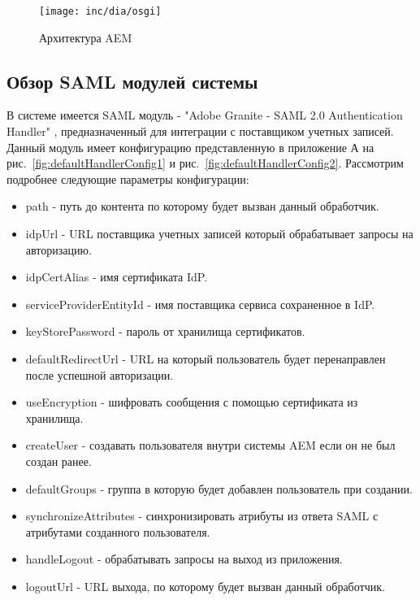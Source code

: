 \begin{figure}[h]
  \centering
  \texttt{[image: inc/dia/osgi]}
  \caption{Архитектура AEM}
  \label{fig:fig02}
\end{figure}

\subsection{Обзор SAML модулей системы}
В системе имеется SAML модуль - "Adobe Granite - SAML 2.0 Authentication Handler" \cite{web:aemSaml}, предназначенный для интеграции с поставщиком учетных записей. Данный модуль имеет конфигурацию представленную в приложение А на рис.~\ref{fig:defaultHandlerConfig1} и рис.~\ref{fig:defaultHandlerConfig2}. Рассмотрим подробнее следующие параметры конфигурации:
\begin{itemize}
\item path - путь до контента по которому будет вызван данный обработчик.
\item idpUrl - URL поставщика учетных записей который обрабатывает запросы на авторизацию.
\item idpCertAlias - имя сертификата IdP.
\item serviceProviderEntityId - имя поставщика сервиса сохраненное в IdP.
\item keyStorePassword - пароль от хранилища сертификатов.
\item defaultRedirectUrl - URL на который пользователь будет перенаправлен после успешной авторизации.
\item useEncryption - шифровать сообщения с помощью сертификата из хранилища.
\item createUser - создавать пользователя внутри системы AEM если он не был создан ранее.
\item defaultGroups - группа в которую будет добавлен пользователь при создании.
\item synchronizeAttributes - синхронизировать атрибуты из ответа SAML с атрибутами созданного пользователя.
\item handleLogout - обрабатывать запросы на выход из приложения.
\item logoutUrl - URL выхода, по которому будет вызван данный обработчик.
\end{itemize}

